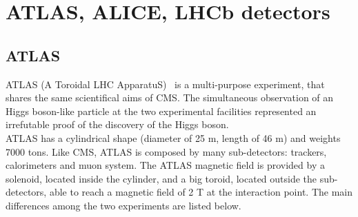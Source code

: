 




\section{ATLAS, ALICE, LHCb detectors}

\subsection{ATLAS}
ATLAS (A Toroidal LHC ApparatuS)~\cite{Aad:2008zzm} is a multi-purpose experiment, that shares the same scientifical aims of CMS. The simultaneous observation of an Higgs boson-like particle at the two experimental facilities represented an irrefutable proof of the discovery of the Higgs boson.\\
ATLAS has a cylindrical shape (diameter of 25 m, length of 46 m) and weights 7000 tons. Like CMS, ATLAS is composed by many sub-detectors: trackers, calorimeters and muon system. The ATLAS magnetic field is provided by a solenoid, located inside the cylinder, and a big toroid, located outside the sub-detectors, able to reach a magnetic field of 2 T at the interaction point. The main differences among the two experiments are listed below.


